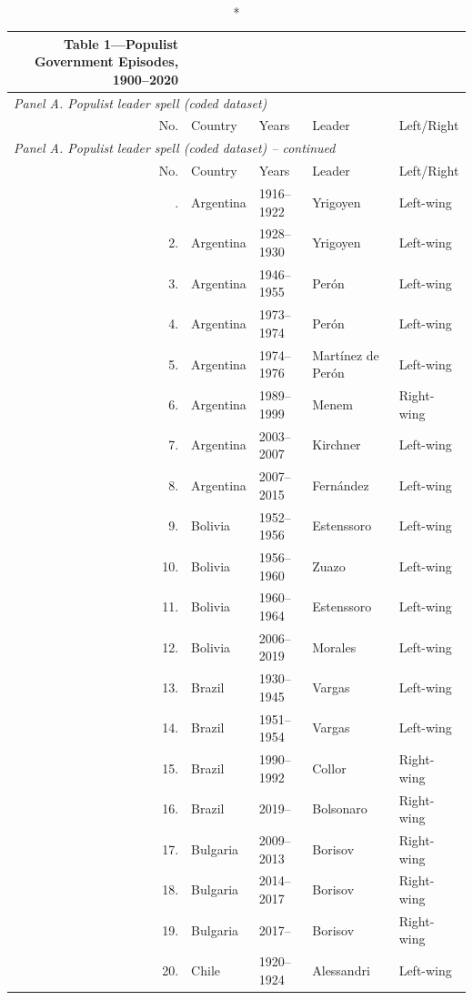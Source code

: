 \def\sym#1{\ifmmode^{#1}\else\(^{#1}\)\fi}
\setlength{\tabcolsep}{5pt}
{\footnotesize
\begin{longtable}{rp{2.2cm}p{2.4cm}p{3.2cm}l}
\caption*{\textbf{Table 1---Populist Government Episodes, 1900--2020}} \\
\hline\hline
\multicolumn{5}{l}{\textit{Panel A. Populist leader spell (coded dataset)}} \\
\hline
No. & Country & Years & Leader & Left/Right \\
\hline
\endfirsthead
\hline\hline
\multicolumn{5}{l}{\textit{Panel A. Populist leader spell (coded dataset) -- continued}} \\
\hline
No. & Country & Years & Leader & Left/Right \\
\hline
\endhead
\hline
\endfoot
1. & Argentina & 1916--1922 & Yrigoyen & Left-wing \\
2. & Argentina & 1928--1930 & Yrigoyen & Left-wing \\
3. & Argentina & 1946--1955 & Per\'on & Left-wing \\
4. & Argentina & 1973--1974 & Per\'on & Left-wing \\
5. & Argentina & 1974--1976 & Mart\'inez de Per\'on & Left-wing \\
6. & Argentina & 1989--1999 & Menem & Right-wing \\
7. & Argentina & 2003--2007 & Kirchner & Left-wing \\
8. & Argentina & 2007--2015 & Fern\'andez & Left-wing \\
9. & Bolivia & 1952--1956 & Estenssoro & Left-wing \\
10. & Bolivia & 1956--1960 & Zuazo & Left-wing \\
11. & Bolivia & 1960--1964 & Estenssoro & Left-wing \\
12. & Bolivia & 2006--2019 & Morales & Left-wing \\
13. & Brazil & 1930--1945 & Vargas & Left-wing \\
14. & Brazil & 1951--1954 & Vargas & Left-wing \\
15. & Brazil & 1990--1992 & Collor & Right-wing \\
16. & Brazil & 2019-- & Bolsonaro & Right-wing \\
17. & Bulgaria & 2009--2013 & Borisov & Right-wing \\
18. & Bulgaria & 2014--2017 & Borisov & Right-wing \\
19. & Bulgaria & 2017-- & Borisov & Right-wing \\
20. & Chile & 1920--1924 & Alessandri & Left-wing \\

\end{longtable}}
